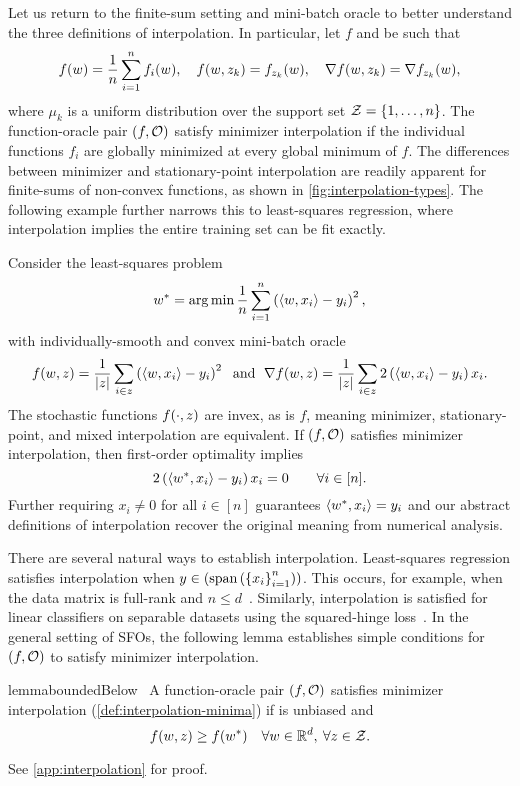 Let us return to the finite-sum setting and mini-batch oracle to better understand the three definitions of interpolation.
In particular, let \( f \) and \oracle{} be such that
\[ f(\w) =  \frac{1}{n} \sum_{i=1}^{n} f_i(\w), \quad f(\w, \zk) = f_{\zk}(\w), \quad \grad(\w, \zk) = \grad_{\zk}(\w),  \]
where \( \mu_k \) is a uniform distribution over the support set \( \calZ = \cbr{1, \ldots, n} \).
The function-oracle pair \( \rbr{f, \oracle{}} \) satisfy minimizer interpolation if the individual functions \( f_i \) are globally minimized at every global minimum of \( f \).
The differences between minimizer and stationary-point interpolation are readily apparent for finite-sums of non-convex functions, as shown in \autoref{fig:interpolation-types}.
The following example further narrows this to least-squares regression, where interpolation implies the entire training set can be fit exactly.
\begin{example}\label{example:ls-interpolation}
    Consider the least-squares problem 
    \[ \wopt = \argmin \frac{1}{n} \sum_{i=1}^n \rbr{\abr{w, x_i} - y_i}^2, \]
    with individually-smooth and convex mini-batch oracle
    \[ f(\w, \z) = \frac{1}{|\z|} \sum_{i \in \z}  \rbr{\abr{w, x_i} - y_i}^2 \; \text{ and } \; \grad(\w, \z) = \frac{1}{|\z|} \sum_{i \in \z} 2 \rbr{\abr{w, x_i} - y_i} x_i. \]
    The stochastic functions \( f(\cdot, \z) \) are invex, as is \( f \), meaning minimizer, stationary-point, and mixed interpolation are equivalent. 
    If \( \rbr{f, \oracle} \) satisfies minimizer interpolation, then first-order optimality implies 
    \[  2 \rbr{\abr{\wopt, x_i} - y_i} x_i = 0 \quad \quad \forall i \in [n]. \] 
    Further requiring \( x_i \neq 0 \) for all \( i \in [n] \) guarantees \( \abr{\wopt, x_i} = y_i \) and our abstract definitions of interpolation recover the original meaning from numerical analysis.  
\end{example}

There are several natural ways to establish interpolation.
Least-squares regression satisfies interpolation when \( y \in \rbr{\text{span}\rbr{\cbr{x_i}_{i=1}^n}} \). 
This occurs, for example, when the data matrix is full-rank and \( n \leq d \)~\citep{hastie2009elements}.
Similarly, interpolation is satisfied for linear classifiers on separable datasets using the squared-hinge loss~\citep{vaswani2019fast}. 
In the general setting of \acp{SFO}, the following lemma establishes simple conditions for \( \rbr{f, \oracle{}} \) to satisfy minimizer interpolation.
\begin{restatable}{lemma}{boundedBelow}~\label{lemma:bounded-below}
    A function-oracle pair \( \rbr{f, \oracle{}} \) satisfies minimizer interpolation (\autoref{def:interpolation-minima}) if \oracle{} is unbiased and 
    \[ f(\w, \z ) \geq f(\wopt) \quad \forall \w \in \R^d, \: \forall \z \in \calZ. \]
\end{restatable}
\noindent See \autoref{app:interpolation} for proof.\hfill \break

